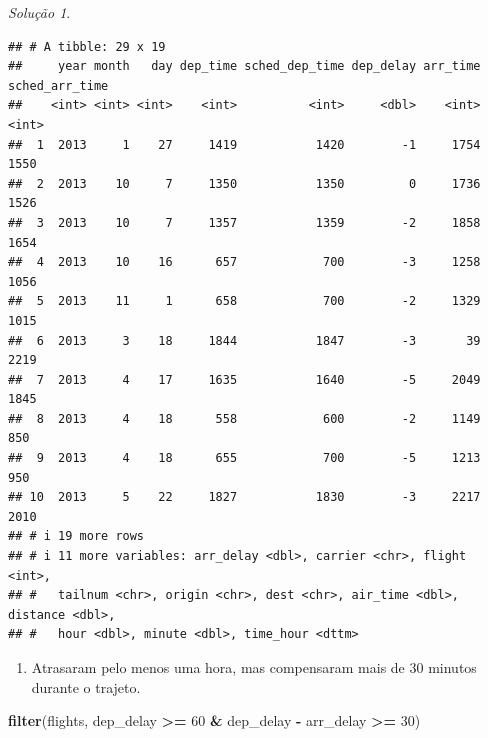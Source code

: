 \documentclass[
]{latex/krantz}
\newenvironment{Shaded}{\begin{snugshade}}{\end{snugshade}}
\newcommand{\DecValTok}[1]{\textcolor[rgb]{0.00,0.00,0.81}{#1}}
\newcommand{\FunctionTok}[1]{\textcolor[rgb]{0.13,0.29,0.53}{\textbf{#1}}}
\newcommand{\NormalTok}[1]{#1}
\newcommand{\SpecialCharTok}[1]{\textcolor[rgb]{0.81,0.36,0.00}{\textbf{#1}}}
\providecommand{\tightlist}{%
  \setlength{\itemsep}{0pt}\setlength{\parskip}{0pt}}
\theoremstyle{definition}
\theoremstyle{definition}
\theoremstyle{definition}
\theoremstyle{definition}
\theoremstyle{remark}
\newtheorem*{solution}{Solução}
\begin{document}
\begin{solution}
\begin{verbatim}
## # A tibble: 29 x 19
##     year month   day dep_time sched_dep_time dep_delay arr_time sched_arr_time
##    <int> <int> <int>    <int>          <int>     <dbl>    <int>          <int>
##  1  2013     1    27     1419           1420        -1     1754           1550
##  2  2013    10     7     1350           1350         0     1736           1526
##  3  2013    10     7     1357           1359        -2     1858           1654
##  4  2013    10    16      657            700        -3     1258           1056
##  5  2013    11     1      658            700        -2     1329           1015
##  6  2013     3    18     1844           1847        -3       39           2219
##  7  2013     4    17     1635           1640        -5     2049           1845
##  8  2013     4    18      558            600        -2     1149            850
##  9  2013     4    18      655            700        -5     1213            950
## 10  2013     5    22     1827           1830        -3     2217           2010
## # i 19 more rows
## # i 11 more variables: arr_delay <dbl>, carrier <chr>, flight <int>,
## #   tailnum <chr>, origin <chr>, dest <chr>, air_time <dbl>, distance <dbl>,
## #   hour <dbl>, minute <dbl>, time_hour <dttm>
\end{verbatim}

\begin{enumerate}
\def\labelenumi{\alph{enumi}.}
\setcounter{enumi}{5}
\tightlist
\item
  Atrasaram pelo menos uma hora, mas compensaram mais de 30 minutos durante o trajeto.
\end{enumerate}

\begin{Shaded}
\begin{Highlighting}[]
\FunctionTok{filter}\NormalTok{(flights, dep\_delay }\SpecialCharTok{\textgreater{}=} \DecValTok{60} \SpecialCharTok{\&}\NormalTok{ dep\_delay }\SpecialCharTok{{-}}\NormalTok{ arr\_delay }\SpecialCharTok{\textgreater{}=} \DecValTok{30}\NormalTok{)}
\end{Highlighting}
\end{Shaded}


\end{solution}
\end{document}
